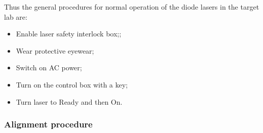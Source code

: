 Thus the general procedures for normal operation of the diode lasers in the target lab are:

\begin {itemize}
\item Enable laser safety interlock box;;
\item Wear protective eyewear;
\item Switch on AC power;
\item Turn on the control box with a key; 
\item Turn laser to Ready and then On.
\end {itemize}

\subsubsection{Alignment procedure}

